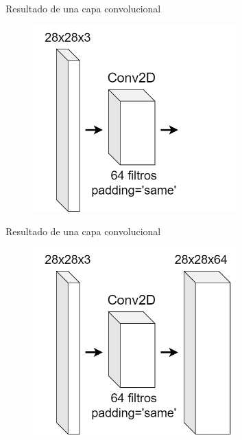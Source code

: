 \begin{frame}{Resultado de una capa convolucional}
\begin{figure}
    \centering
    \includegraphics[width=0.7\textwidth]{Slides/figures/Tema 3/ConvDimensions_1.png}
\end{figure}
\end{frame}

\begin{frame}{Resultado de una capa convolucional}
\begin{figure}
    \centering
    \includegraphics[width=0.7\textwidth]{Slides/figures/Tema 3/ConvDimensions_2.png}
\end{figure}
\end{frame}

